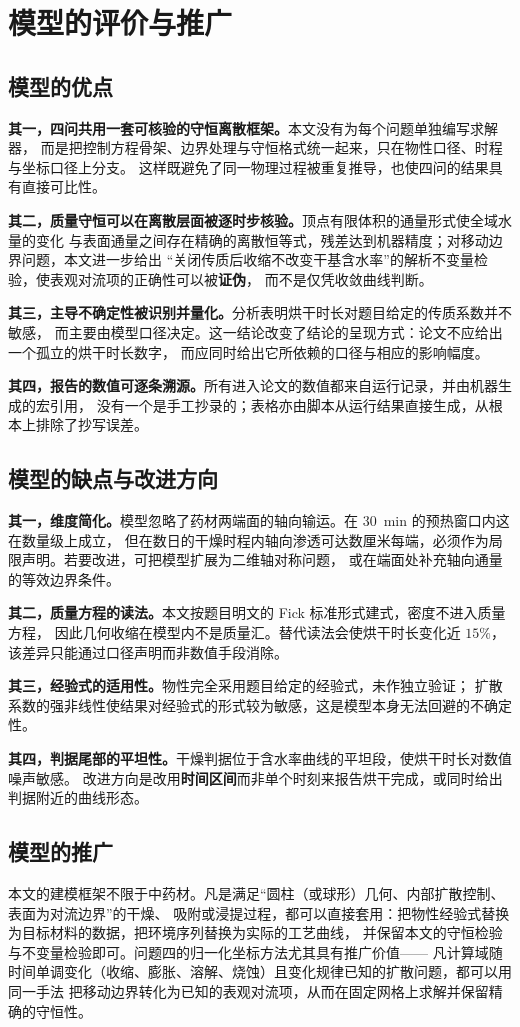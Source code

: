 \section{模型的评价与推广}

\subsection{模型的优点}

\textbf{其一，四问共用一套可核验的守恒离散框架。}本文没有为每个问题单独编写求解器，
而是把控制方程骨架、边界处理与守恒格式统一起来，只在物性口径、时程与坐标口径上分支。
这样既避免了同一物理过程被重复推导，也使四问的结果具有直接可比性。

\textbf{其二，质量守恒可以在离散层面被逐时步核验。}顶点有限体积的通量形式使全域水量的变化
与表面通量之间存在精确的离散恒等式，残差达到机器精度；对移动边界问题，本文进一步给出
“关闭传质后收缩不改变干基含水率”的解析不变量检验，使表观对流项的正确性可以被\textbf{证伪}，
而不是仅凭收敛曲线判断。

\textbf{其三，主导不确定性被识别并量化。}分析表明烘干时长对题目给定的传质系数并不敏感，
而主要由模型口径决定。这一结论改变了结论的呈现方式：论文不应给出一个孤立的烘干时长数字，
而应同时给出它所依赖的口径与相应的影响幅度。

\textbf{其四，报告的数值可逐条溯源。}所有进入论文的数值都来自运行记录，并由机器生成的宏引用，
没有一个是手工抄录的；表格亦由脚本从运行结果直接生成，从根本上排除了抄写误差。

\subsection{模型的缺点与改进方向}

\textbf{其一，维度简化。}模型忽略了药材两端面的轴向输运。在 $30$~min 的预热窗口内这在数量级上成立，
但在数日的干燥时程内轴向渗透可达数厘米每端，必须作为局限声明。若要改进，可把模型扩展为二维轴对称问题，
或在端面处补充轴向通量的等效边界条件。

\textbf{其二，质量方程的读法。}本文按题目明文的 Fick 标准形式建式，密度不进入质量方程，
因此几何收缩在模型内不是质量汇。替代读法会使烘干时长变化近 $15\%$，该差异只能通过口径声明而非数值手段消除。

\textbf{其三，经验式的适用性。}物性完全采用题目给定的经验式，未作独立验证；
扩散系数的强非线性使结果对经验式的形式较为敏感，这是模型本身无法回避的不确定性。

\textbf{其四，判据尾部的平坦性。}干燥判据位于含水率曲线的平坦段，使烘干时长对数值噪声敏感。
改进方向是改用\textbf{时间区间}而非单个时刻来报告烘干完成，或同时给出判据附近的曲线形态。

\subsection{模型的推广}

本文的建模框架不限于中药材。凡是满足“圆柱（或球形）几何、内部扩散控制、表面为对流边界”的干燥、
吸附或浸提过程，都可以直接套用：把物性经验式替换为目标材料的数据，把环境序列替换为实际的工艺曲线，
并保留本文的守恒检验与不变量检验即可。问题四的归一化坐标方法尤其具有推广价值——
凡计算域随时间单调变化（收缩、膨胀、溶解、烧蚀）且变化规律已知的扩散问题，都可以用同一手法
把移动边界转化为已知的表观对流项，从而在固定网格上求解并保留精确的守恒性。
